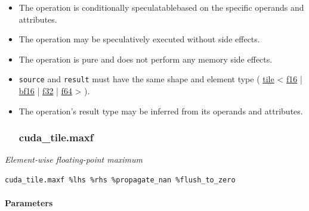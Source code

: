 \documentclass{article}
\begin{document}
\begin{itemize}
\item The operation is conditionally speculatablebased on the specific operands and attributes.
\item The operation may be speculatively executed without side effects.
\item The operation is pure and does not perform any memory side effects.
\item \texttt{source} and \texttt{result} must have the same shape and element type ( \href{https://docs.nvidia.com/cuda/tile-ir/latest/sections/types.html#type-tile}{tile} < \href{https://docs.nvidia.com/cuda/tile-ir/latest/sections/types.html#subsection-element-types}{f16} | \href{https://docs.nvidia.com/cuda/tile-ir/latest/sections/types.html#subsection-element-types}{bf16} | \href{https://docs.nvidia.com/cuda/tile-ir/latest/sections/types.html#subsection-element-types}{f32} | \href{https://docs.nvidia.com/cuda/tile-ir/latest/sections/types.html#subsection-element-types}{f64} > ).
\item The operation's result type may be inferred from its operands and attributes.


\subsubsection{cuda\_tile.maxf}

\end{itemize}
\textit{Element-wise floating-point maximum}


\begin{lstlisting}
cuda_tile.maxf %lhs %rhs %propagate_nan %flush_to_zero
\end{lstlisting}

\paragraph{Parameters}
\end{document}
